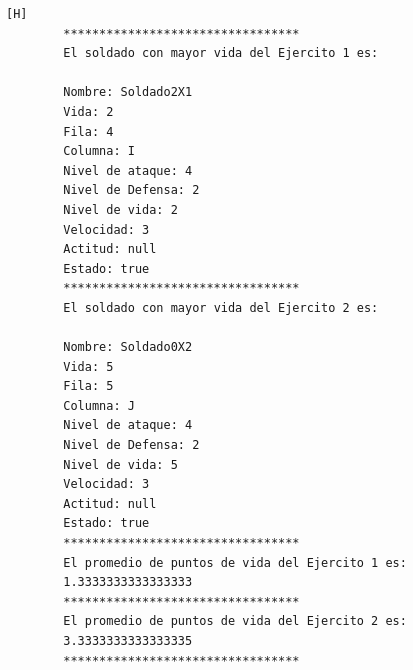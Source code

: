 \documentclass{article}
\begin{document}
	\begin{lstlisting}[language=bash,caption={Ejecucion:}][H]
		*********************************
		El soldado con mayor vida del Ejercito 1 es: 
		
		Nombre: Soldado2X1
		Vida: 2
		Fila: 4
		Columna: I
		Nivel de ataque: 4
		Nivel de Defensa: 2
		Nivel de vida: 2
		Velocidad: 3
		Actitud: null
		Estado: true
		*********************************
		El soldado con mayor vida del Ejercito 2 es: 
		
		Nombre: Soldado0X2
		Vida: 5
		Fila: 5
		Columna: J
		Nivel de ataque: 4
		Nivel de Defensa: 2
		Nivel de vida: 5
		Velocidad: 3
		Actitud: null
		Estado: true
		*********************************
		El promedio de puntos de vida del Ejercito 1 es: 
		1.3333333333333333
		*********************************
		El promedio de puntos de vida del Ejercito 2 es: 
		3.3333333333333335
		*********************************

	\end{lstlisting}
\end{document}
